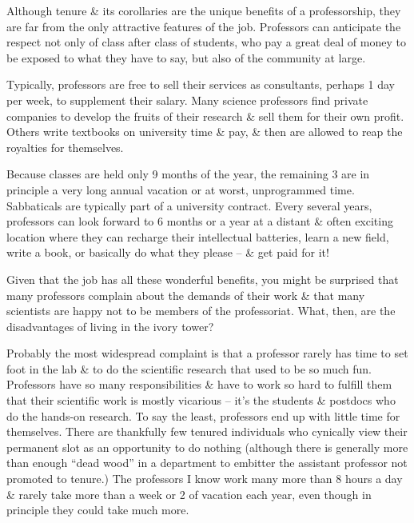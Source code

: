 \documentclass{article}
\begin{document}
\begin{enumerate}
\begin{itemize}
\begin{itemize}
			Although tenure \& its corollaries are the unique benefits of a professorship, they are far from the only attractive features of the job. Professors can anticipate the respect not only of class after class of students, who pay a great deal of money to be exposed to what they have to say, but also of the community at large.
			
			Typically, professors are free to sell their services as consultants, perhaps 1 day per week, to supplement their salary. Many science professors find private companies to develop the fruits of their research \& sell them for their own profit. Others write textbooks on university time \& pay, \& then are allowed to reap the royalties for themselves.
			
			Because classes are held only 9 months of the year, the remaining 3 are in principle a very long annual vacation or at worst, unprogrammed time. Sabbaticals are typically part of a university contract. Every several years, professors can look forward to 6 months or a year at a distant \& often exciting location where they can recharge their intellectual batteries, learn a new field, write a book, or basically do what they please -- \& get paid for it!
			
			Given that the job has all these wonderful benefits, you might be surprised that many professors complain about the demands of their work \& that many scientists are happy not to be members of the professoriat. What, then, are the disadvantages of living in the ivory tower?
			
			Probably the most widespread complaint is that a professor rarely has time to set foot in the lab \& to do the scientific research that used to be so much fun. Professors have so many responsibilities \& have to work so hard to fulfill them that their scientific work is mostly vicarious -- it's the students \& postdocs who do the hands-on research. To say the least, professors end up with little time for themselves. There are thankfully few tenured individuals who cynically view their permanent slot as an opportunity to do nothing (although there is generally more than enough ``dead wood'' in a department to embitter the assistant professor not promoted to tenure.) The professors I know work many more than 8 hours a day \& rarely take more than a week or 2 of vacation each year, even though in principle they could take much more.
			

\end{itemize}
\end{itemize}
\end{enumerate}
\end{document}
